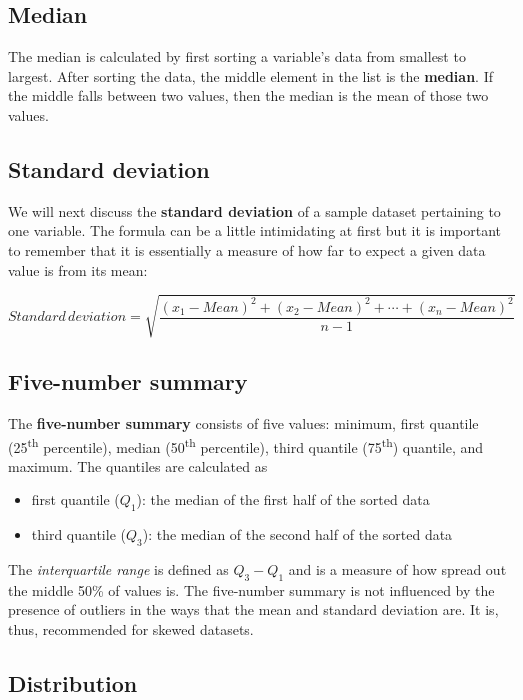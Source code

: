 \documentclass[12pt,]{krantz}
\providecommand{\tightlist}{%
  \setlength{\itemsep}{0pt}\setlength{\parskip}{0pt}}
\begin{document}
\subsection{Median}\label{median}

The median is calculated by first sorting a variable's data from
smallest to largest. After sorting the data, the middle element in the
list is the \textbf{median}. If the middle falls between two values,
then the median is the mean of those two values.

\subsection{Standard deviation}\label{standard-deviation}

We will next discuss the \textbf{standard deviation} of a sample dataset
pertaining to one variable. The formula can be a little intimidating at
first but it is important to remember that it is essentially a measure
of how far to expect a given data value is from its mean:

\[Standard \, deviation = \sqrt{\frac{(x_1 - Mean)^2 + (x_2 - Mean)^2 + \cdots + (x_n - Mean)^2}{n - 1}}\]

\subsection{Five-number summary}\label{five-number-summary}

The \textbf{five-number summary} consists of five values: minimum, first
quantile (25\textsuperscript{th} percentile), median
(50\textsuperscript{th} percentile), third quantile
(75\textsuperscript{th}) quantile, and maximum. The quantiles are
calculated as

\begin{itemize}
\tightlist
\item
  first quantile (\(Q_1\)): the median of the first half of the sorted
  data
\item
  third quantile (\(Q_3\)): the median of the second half of the sorted
  data
\end{itemize}

The \emph{interquartile range} is defined as \(Q_3 - Q_1\) and is a
measure of how spread out the middle 50\% of values is. The five-number
summary is not influenced by the presence of outliers in the ways that
the mean and standard deviation are. It is, thus, recommended for skewed
datasets.

\subsection{Distribution}\label{distribution}
\end{document}
